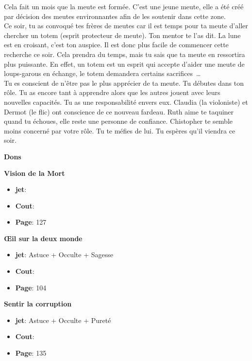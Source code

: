 \documentclass[oneside,12pt]{book}
\newcommand\don[5]{
\textbf{#1} \\
#2
\begin{itemize}
\item{ \textbf{jet}: #3}
\item{ \textbf{Cout}: #4}
\item{ \textbf{Page}: #5}
\end{itemize}
\vspace{0.5cm}
}
\begin{document}
\begin{flushleft}
\begin{description}
{Cela fait un mois que la meute est formée. C'est une jeune meute, elle a  été créé par décision des meutes environnantes afin de les soutenir dans cette zone.\\

Ce soir, tu as convoqué tes frères de meutes car il est temps pour ta meute d'aller chercher un totem (esprit protecteur de meute). Ton mentor te l'as dit. La lune est en croisant, c'est ton auspice. Il est donc plus facile de commencer cette recherche ce soir. Cela prendra du temps, mais tu sais que ta meute en ressortira plus puissante. En effet, un totem est un esprit qui accepte d'aider une meute de loups-garous en échange, le totem demandera certains sacrifices …\\

Tu es conscient de n'être pas le plus apprécier de ta meute. 
Tu débutes dans ton rôle. Tu as encore tant à apprendre alors que les autres jouent avec leurs nouvelles capacités. 
Tu as une responsabilité envers eux. Claudia (la violoniste) et Dermot (le flic) ont conscience de ce nouveau fardeau. Ruth aime te taquiner quand tu échoues, elle reste une personne de confiance. 
Chistopher te semble moins concerné par votre rôle. Tu te méfies de lui. Tu espères qu'il viendra ce soir.\\
}
\end{description}
\clearpage
\textbf{\large Dons} 
\vspace{0.5cm}

\don{Vision de la Mort}{}{}{}{127}
\don{Œil sur la deux monde}{}{Astuce + Occulte + Sagesse}{}{104}
\don{Sentir la corruption}{}{Astuce + Occulte + Pureté}{}{135}

\clearpage

\end{flushleft}
\end{document}

